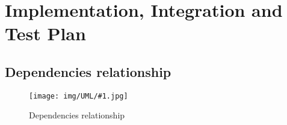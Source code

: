 \documentclass[../DD0.tex]{subfiles}
\newcommand{\fetchUML}[4] {
  \begin{figure}[h!]
    \centering
    \hspace*{-#4cm}
    \texttt{[image: img/UML/\#1.jpg]}
    \caption{#2}
    \label{fig:#1}
  \end{figure}
}
\begin{document}
\section{Implementation, Integration and Test Plan}
\label{sec:imp}
\subsection{Dependencies relationship}

\fetchUML
      {Dependencies_Graph}
      {Dependencies relationship}
      {1}           %
      {0}  
\end{document}
